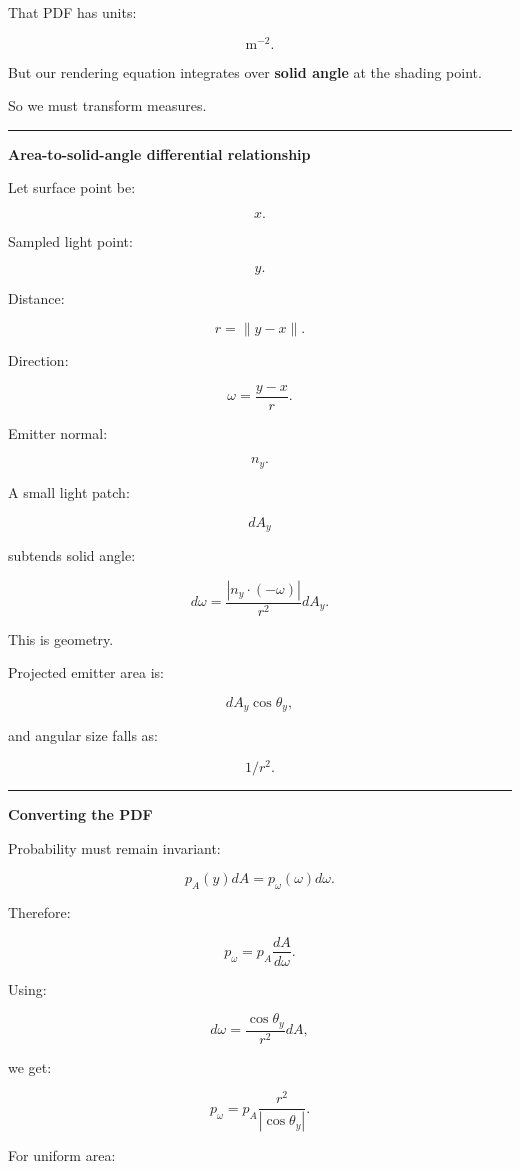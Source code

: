 That PDF has units:

\[
\mathrm{m}^{-2}.
\]

But our rendering equation integrates over \textbf{solid angle} at the shading point.

So we must transform measures.

\begin{center}\rule{0.5\linewidth}{0.5pt}\end{center}

\textbf{Area-to-solid-angle differential relationship}

Let surface point be:

\[
x.
\]

Sampled light point:

\[
y.
\]

Distance:

\[
r=\|y-x\|.
\]

Direction:

\[
\omega=
\frac{y-x}{r}.
\]

Emitter normal:

\[
n_y.
\]

A small light patch:

\[
dA_y
\]

subtends solid angle:

\[
\boxed{
d\omega
=
\frac{
|n_y\cdot(-\omega)|
}{
r^2
}
dA_y.
}
\]

This is geometry.

Projected emitter area is:

\[
dA_y\cos\theta_y,
\]

and angular size falls as:

\[
1/r^2.
\]

\begin{center}\rule{0.5\linewidth}{0.5pt}\end{center}

\textbf{Converting the PDF}

Probability must remain invariant:

\[
p_A(y)dA
=
p_\omega(\omega)d\omega.
\]

Therefore:

\[
p_\omega
=
p_A
\frac{dA}{d\omega}.
\]

Using:

\[
d\omega
=
\frac{
\cos\theta_y
}{
r^2
}
dA,
\]

we get:

\[
\boxed{
p_\omega
=
p_A
\frac{
r^2
}{
|\cos\theta_y|
}.
}
\]

For uniform area:

